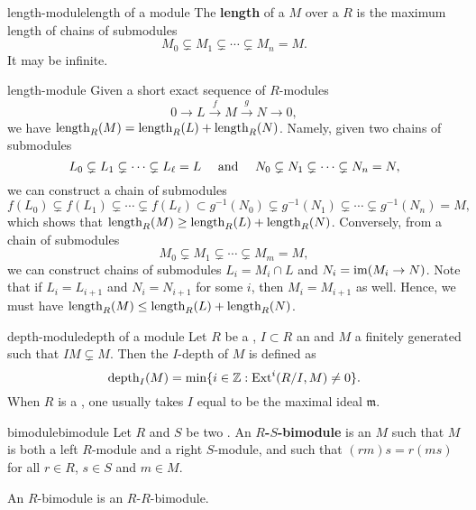 \begin{topic}{length-module}{length of a module}
    The \textbf{length} of a  $M$ over a  $R$ is the maximum length of chains of submodules
    \[ M_0 \subsetneq M_1 \subsetneq \cdots \subsetneq M_n = M . \]
    It may be infinite.
\end{topic}

\begin{example}{length-module}
    Given a short exact sequence of $R$-modules
    \[ 0 \to L \xrightarrow{f} M \xrightarrow{g} N \to 0 , \]
    we have $\textup{length}_R(M) = \textup{length}_R(L) + \textup{length}_R(N)$. Namely, given two chains of submodules
    \[ L_0 \subsetneq L_1 \subsetneq \cdots \subsetneq L_\ell = L \quad \textup{ and } \quad N_0 \subsetneq N_1 \subsetneq \cdots \subsetneq N_n = N , \]
    we can construct a chain of submodules
    \[ f(L_0) \subsetneq f(L_1) \subsetneq \cdots \subsetneq f(L_\ell) \subset g^{-1}(N_0) \subsetneq g^{-1}(N_1) \subsetneq \cdots \subsetneq g^{-1}(N_n) = M , \]
    which shows that $\textup{length}_R(M) \ge \textup{length}_R(L) + \textup{length}_R(N)$. Conversely, from a chain of submodules
    \[ M_0 \subsetneq M_1 \subsetneq \cdots \subsetneq M_m = M , \]
    we can construct chains of submodules $L_i = M_i \cap L$ and $N_i = \operatorname{im}(M_i \to N)$. Note that if $L_i = L_{i + 1}$ and $N_i = N_{i + 1}$ for some $i$, then $M_i = M_{i + 1}$ as well. Hence, we must have $\textup{length}_R(M) \le \textup{length}_R(L) + \textup{length}_R(N)$.
\end{example}

\begin{topic}{depth-module}{depth of a module}
    Let $R$ be a , $I \subset R$ an  and $M$ a finitely generated  such that $IM \subsetneq M$. Then the $I$-depth of $M$ is defined as
    \[ \text{depth}_I(M) = \min \{ i \in \mathbb{Z} : \text{Ext}^i(R/I, M) \ne 0 \} . \]
    When $R$ is a , one usually takes $I$ equal to be the maximal ideal $\mathfrak{m}$.
\end{topic}

\begin{topic}{bimodule}{bimodule}
    Let $R$ and $S$ be two . An \textbf{$R$-$S$-bimodule} is an  $M$ such that $M$ is both a left $R$-module and a right $S$-module, and such that $(rm)s = r(ms)$ for all $r \in R$, $s \in S$ and $m \in M$.
    
    An $R$-bimodule is an $R$-$R$-bimodule.
\end{topic}

